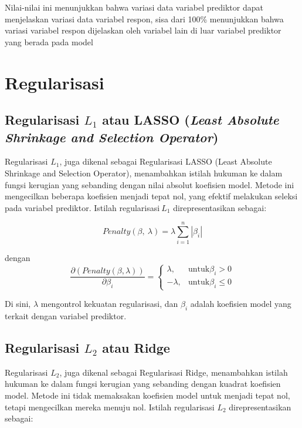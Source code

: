 Nilai-nilai ini menunjukkan bahwa variasi data variabel prediktor dapat
menjelaskan variasi data variabel respon, sisa dari 100\% menunjukkan
bahwa variasi variabel respon dijelaskan oleh variabel lain di luar
variabel prediktor yang berada pada model
%
\section{Regularisasi}
\subsection{Regularisasi $L_1$ atau LASSO (\emph{Least Absolute Shrinkage and Selection Operator})}
Regularisasi \(L_{1}\), juga dikenal sebagai Regularisasi LASSO (Least
Absolute Shrinkage and Selection Operator), menambahkan istilah hukuman
ke dalam fungsi kerugian yang sebanding dengan nilai absolut koefisien
model. Metode ini mengecilkan beberapa koefisien menjadi tepat nol, yang
efektif melakukan seleksi pada variabel prediktor. Istilah
regularisasi\(\ L_{1}\) direpresentasikan sebagai:

\begin{equation}\label{penaltyL1}
    Penalty\left( \beta,\ \lambda \right) = \lambda\sum_{i = 1}^{n}\left| \beta_{i} \right|
\end{equation}

dengan
\begin{equation}
	\frac{\partial\left(Penalty(\beta, \lambda) \right)}{\partial\beta_i} = \begin{cases}
		\lambda, & \text{untuk} \beta_i > 0 \\
		-\lambda, & \text{untuk} \beta_i\leq 0
	\end{cases}
\end{equation}

Di sini, \(\lambda\) mengontrol kekuatan regularisasi, dan \(\beta_{i}\)
adalah koefisien model yang terkait dengan variabel prediktor\citep*{Hastie2009}.

%
\subsection{Regularisasi $L_2$ atau Ridge}
Regularisasi \(L_{2}\), juga dikenal sebagai Regularisasi Ridge,
menambahkan istilah hukuman ke dalam fungsi kerugian yang sebanding
dengan kuadrat koefisien model. Metode ini tidak memaksakan koefisien
model untuk menjadi tepat nol, tetapi mengecilkan mereka menuju nol.
Istilah regularisasi \(L_{2}\) direpresentasikan sebagai:

